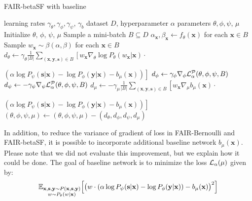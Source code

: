 \documentclass[preprint,12pt]{elsarticle}
\begin{document}
\begin{algorithm}[h!]
	\caption{FAIR-betaSF with baseline}
	\label{alg:beta-base}
	\begin{algorithmic}
		 learning rates $\gamma_\theta, \gamma_\phi, \gamma_\psi$, $\gamma_b$ dataset $D$,  hyperparameter $\alpha$
		 parameters $\theta,\phi,\psi$, $\mu$
		\vspace{2mm}
		\State Initialize $\theta$, $\phi$, $\psi$, $\mu$
		\State Sample a mini-batch $B\subseteq D$
		\State $\alpha_\mathbf{x},\beta_\mathbf{x}\leftarrow f_\theta(\mathbf{x})$ for each $\mathbf{x}\in B$
		\State Sample $w_\mathbf{x}\sim \beta(\alpha,\beta)$ for each $\mathbf{x}\in B$
		\State $d_{\theta} \leftarrow \gamma_\theta\frac{1}{|B|} \sum_{(\mathbf{x},\mathbf{y},\mathbf{s})\in B}\left[w_\mathbf{x}\nabla_{\theta}\log P_\theta(w_\mathbf{x}|\mathbf{x})\cdot\right.$
		
		\hspace{1.5cm}$\left.(\alpha\log P_\psi(\mathbf{s}|\mathbf{x})-\log P_\phi(\mathbf{y}|\mathbf{x})-b_\mu(\textbf{x}))\right]$
		\State $d_{\phi} \leftarrow \gamma_\phi\nabla_{\phi}{\cal L}^{\cal P}_\alpha(\theta,\phi,\psi,B)$
		\State $d_{\psi} \leftarrow -\gamma_\psi\nabla_{\psi}{\cal L}^{\cal P}_\alpha(\theta,\phi,\psi,B)$
		\State $d_{\mu} \leftarrow -\gamma_\mu\frac{1}{|B|} \sum_{(\mathbf{x},\mathbf{y},\mathbf{s})\in B}\left[w_\mathbf{x}\nabla_\mu b_\mu(\mathbf{x})\cdot\right.$
		
		\hspace{1.5cm}$\left.(\alpha\log P_\psi(\mathbf{s}|\mathbf{x})-\log P_\phi(\mathbf{y}|\mathbf{x}) - b_\mu(\mathbf{x}))\right]$
		\State $(\theta,\phi,\psi,\mu) \leftarrow (\theta,\phi,\psi,\mu) - (d_{\theta},d_{\phi}, d_{\psi},  d_{\mu})$
		\EndWhile
	\end{algorithmic}
\end{algorithm}


\iffalse
In addition, to reduce the variance of gradient of loss in FAIR-Bernoulli and FAIR-betaSF, it is possible to incorporate additional baseline network $b_\mu(\mathbf{x})$. Please note that we did not evaluate this improvement, but we explain how it could be done. The goal of baseline network is to minimize the loss ${\cal L}_{\alpha}(\mu)$ given by:
\begin{equation}
\label{Eq.Baseline-loss}
\mathbb{E}_{\substack{\mathbf{x}, \mathbf{s}, \mathbf{y}\sim P(\mathbf{x},\mathbf{s}, \mathbf{y})\\w \sim P_\theta(w|\mathbf{x})}} \Big[ \vphantom{)^2}\big(
w \cdot ( \alpha \log P_\psi(\mathbf{s}|\mathbf{x}) - \log P_\phi(\mathbf{y}|\mathbf{x})) - b_\mu(\mathbf{x})\big)^2 \Big]
\end{equation}
\end{document}
